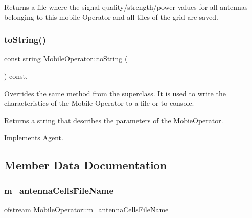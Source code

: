 \begin{DoxyReturn}{Returns}
a file where the signal quality/strength/power values for all antennas belonging to this mobile Operator and all tiles of the grid are saved. 
\end{DoxyReturn}
\mbox{\label{class_mobile_operator_aa83724a149499ef10678ad651a5b40df}} 
\subsubsection{\texorpdfstring{to\+String()}{toString()}}
{\footnotesize\ttfamily const string Mobile\+Operator\+::to\+String (\begin{DoxyParamCaption}{ }\end{DoxyParamCaption}) const\hspace{0.3cm}{\ttfamily [override]}, {\ttfamily [virtual]}}

Overrides the same method from the superclass. It is used to write the characteristics of the Mobile Operator to a file or to console. \begin{DoxyReturn}{Returns}
a string that describes the parameters of the Mobie\+Operator. 
\end{DoxyReturn}


Implements \hyperlink{class_agent_a44f291596d10c7878b0641d6ec156328}{Agent}.



\subsection{Member Data Documentation}
\mbox{\label{class_mobile_operator_abd11e27d3ed1273be761a55da1549fa4}} 
\subsubsection{\texorpdfstring{m\+\_\+antenna\+Cells\+File\+Name}{m\_antennaCellsFileName}}
{\footnotesize\ttfamily ofstream Mobile\+Operator\+::m\+\_\+antenna\+Cells\+File\+Name\hspace{0.3cm}{\ttfamily [private]}}

